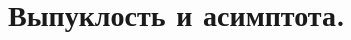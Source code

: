 \documentclass[../main.tex]{subfiles}
\begin{document}
\newpage
\section{Выпуклость и асимптота.}
\end{document}
